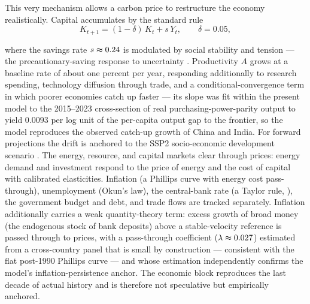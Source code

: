 \documentclass[a4paper,fleqn]{cas-sc}
\begin{document}
This very mechanism allows a carbon price to restructure the economy
realistically. Capital accumulates by the standard rule
\begin{equation}
K_{t+1} = (1-\delta)\,K_t + s\,Y_t, \qquad \delta = 0.05,
\label{eq:capital}
\end{equation}

where the savings rate $s\thickapprox 0.24$ is modulated by social stability and tension --- the precautionary-saving response to uncertainty \citep{mody2012}. Productivity $A$ grows at a baseline rate of about one percent per year, responding additionally to research
spending, technology diffusion through trade, and a conditional-convergence term in which poorer economies catch up faster --- its slope was fit within the present model to the 2015--2023 cross-section of real purchasing-power-parity output to yield $0.0093$ per log unit of the per-capita output gap to the frontier, so the model reproduces the observed catch-up growth of China and India. For forward projections the drift is anchored to the SSP2 socio-economic development scenario \citep{riahi2017}. The energy, resource, and capital markets clear through prices: energy demand and investment respond to the price of energy and the cost of capital with calibrated elasticities.
Inflation (a Phillips curve with energy cost pass-through), unemployment (Okun's law), the
central-bank rate (a Taylor rule, \citep{taylor1993}), the government budget and debt, and trade
flows are tracked separately. Inflation additionally carries a weak quantity-theory term: excess
growth of broad money (the endogenous stock of bank deposits) above a stable-velocity reference is
passed through to prices, with a pass-through coefficient ($\lambda\thickapprox0.027$) estimated from a
cross-country panel that is small by construction --- consistent with the flat post-1990 Phillips
curve --- and whose estimation independently confirms the model's inflation-persistence anchor. The
economic block reproduces the last decade of actual history and is
therefore not speculative but empirically anchored.
\end{document}
